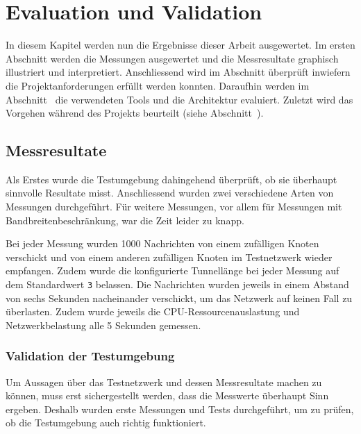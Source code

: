 \chapter{Evaluation und Validation}
\label{ch:evaluation}


In diesem Kapitel werden nun die Ergebnisse dieser Arbeit ausgewertet.
Im ersten Abschnitt  werden die Messungen
ausgewertet und die Messresultate graphisch illustriert und interpretiert.
Anschliessend wird im Abschnitt  überprüft inwiefern die Projektanforderungen erfüllt werden konnten.
Daraufhin werden im Abschnitt~ die verwendeten Tools und die Architektur evaluiert.
Zuletzt wird das Vorgehen während des Projekts beurteilt (siehe Abschnitt~).

\section{Messresultate}\label{sec:messresultate}

Als Erstes wurde die Testumgebung dahingehend überprüft, ob sie überhaupt sinnvolle Resultate misst.
Anschliessend wurden zwei verschiedene Arten von Messungen durchgeführt.
Für weitere Messungen, vor allem für Messungen mit Bandbreitenbeschränkung, war die Zeit leider zu knapp.

Bei jeder Messung wurden 1000 Nachrichten von einem zufälligen Knoten verschickt
und von einem anderen zufälligen Knoten im Testnetzwerk wieder empfangen.
Zudem wurde die konfigurierte Tunnellänge bei jeder Messung auf dem Standardwert \lstinline|3| belassen.
Die Nachrichten wurden jeweils in einem Abstand von sechs Sekunden nacheinander verschickt,
um das Netzwerk auf keinen Fall zu überlasten.
Zudem wurde jeweils die CPU-Ressourcenauslastung und Netzwerkbelastung alle 5 Sekunden gemessen.

\subsection{Validation der Testumgebung}\label{sec:validation_testumgebung}

Um Aussagen über das Testnetzwerk und dessen Messresultate machen zu können,
muss erst sichergestellt werden, dass die Messwerte überhaupt Sinn ergeben.
Deshalb wurden erste Messungen und Tests durchgeführt, um zu prüfen, ob die Testumgebung auch richtig funktioniert.

